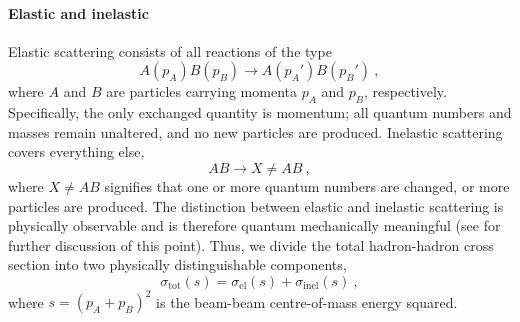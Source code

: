 \paragraph{Elastic and inelastic} Elastic scattering 
consists of  all reactions of the type 
\begin{equation}
A(p_A)B(p_B)\to A(p_A')B(p_B')~,
\end{equation}
where $A$ and $B$ are particles
carrying momenta $p_A$ and $p_B$, respectively. Specifically, 
the only exchanged quantity is momentum; all quantum numbers and
masses remain unaltered, and no new particles are produced. 
Inelastic scattering covers everything else, \ie  
\begin{equation}
 AB\to X \ne AB~,
\end{equation} 
where $X\ne AB$ signifies that one 
or more quantum numbers are changed, or more particles are
produced. The distinction between elastic and inelastic scattering is
physically observable and is therefore quantum mechanically
meaningful (see  for further discussion
of this point). 
Thus, we divide the total hadron-hadron cross
section into two physically distinguishable components, 
\begin{equation}
\sigma_{\mathrm{tot}}(s) = 
\sigma_{\mathrm{el}}(s) +
\sigma_{\mathrm{inel}}(s)~, 
\end{equation}
where $s=(p_A+p_B)^2$ is the beam-beam centre-of-mass energy squared. 

